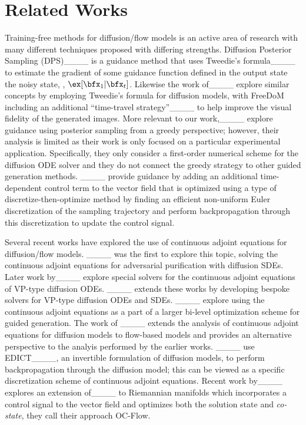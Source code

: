 \section{Related Works}
Training-free methods for diffusion/flow models is an active area of research with many different techniques proposed with differing strengths.
Diffusion Posterior Sampling (DPS)____ is a guidance method that uses Tweedie's formula____ to estimate the gradient of some guidance function defined in the output state \wrt the noisy state, \ie, $\ex[\bfx_1|\bfx_t]$. 
Likewise the work of____ explore similar concepts by employing Tweedie's formula for diffusion models, with FreeDoM including an additional ``time-travel strategy''____ to help improve the visual fidelity of the generated images.
More relevant to our work,____ explore guidance using posterior sampling from a greedy perspective; however, their analysis is limited as their work is only focused on a particular experimental application.
Specifically, they only consider a first-order numerical scheme for the diffusion ODE solver and they do not connect the greedy strategy to other guided generation methods.
____ provide guidance by adding an additional time-dependent control term to the vector field that is optimized using a type of discretize-then-optimize
method by finding an efficient non-uniform Euler discretization of the sampling trajectory and perform backpropagation through this discretization to update the control signal.


Several recent works have explored the use of continuous adjoint equations for diffusion/flow models.
____ was the first to explore this topic, solving the continuous adjoint equations for adversarial purification with diffusion SDEs.
Later work by____ explore special solvers for the continuous adjoint equations of VP-type diffusion ODEs.
____ extends these works by developing bespoke solvers for VP-type diffusion ODEs and SDEs.
____ explore using the continuous adjoint equations as a part of a larger bi-level optimization scheme for guided generation.
The work of ____ extends the analysis of continuous adjoint equations for diffusion models to flow-based models and provides an alternative perspective to the analyis performed by the earlier works.
____ use EDICT____, an invertible formulation of diffusion models, to perform backpropagation through the diffusion model; this can be viewed as a specific discretization scheme of continuous adjoint equations.
Recent work by____ explores an extension of____ to Riemannian manifolds which incorporates a control signal to the vector field and optimizes both the solution state and \textit{co-state}, they call their approach OC-Flow.